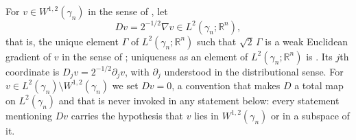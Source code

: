 \begin{definition}
For $v \in W^{1,2}(\gamma_n)$ in the sense of , let
\[
  Dv = 2^{-1/2}\nabla v \in L^2(\gamma_n;\mathbb{R}^n),
\]
that is, the unique element $\Gamma$ of $L^2(\gamma_n;\mathbb{R}^n)$ such that
$\sqrt2\,\Gamma$ is a weak Euclidean gradient of $v$ in the sense of
; uniqueness as an element of
$L^2(\gamma_n;\mathbb{R}^n)$ is .  Its $j$th
coordinate is $D_j v = 2^{-1/2}\partial_j v$, with $\partial_j$ understood in the
distributional sense.  For $v \in L^2(\gamma_n)\setminus W^{1,2}(\gamma_n)$ we set
$Dv = 0$, a convention that makes $D$ a total map on $L^2(\gamma_n)$ and that is
never invoked in any statement below: every statement mentioning $Dv$ carries the
hypothesis that $v$ lies in $W^{1,2}(\gamma_n)$ or in a subspace of it.
\end{definition}
